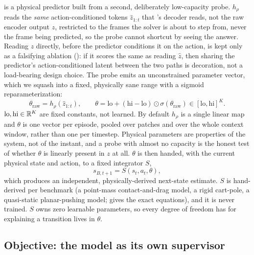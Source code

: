 \pathB is a physical predictor built from a second, deliberately
low-capacity probe. $h_\rho$ reads the \emph{same} action-conditioned
tokens $\hat z_{1:t}$ that \pathA's decoder reads, not the raw encoder
output $z$, restricted to the frames the solver is about to step from,
never the frame being predicted, so the probe cannot shortcut by seeing
the answer. Reading $z$ directly, before the predictor conditions it on
the action, is kept only as a falsifying ablation
(): if it scores the same as reading
$\hat z$, then sharing the predictor's action-conditioned latent between
the two paths is decoration, not a load-bearing design choice. The probe
emits an unconstrained parameter vector, which we squash into a fixed,
physically sane range with a sigmoid reparameterization:
\begin{equation}
  \theta_{\mathrm{raw}} = h_\rho(\hat z_{1:t}), \qquad
  \theta = \mathrm{lo} + (\mathrm{hi} - \mathrm{lo}) \odot
    \sigma(\theta_{\mathrm{raw}}) \in [\mathrm{lo}, \mathrm{hi}]^K.
\end{equation}
$\mathrm{lo}, \mathrm{hi} \in \mathbb{R}^K$ are fixed constants, not learned.
By default $h_\rho$ is a single linear map and $\theta$ is one vector
per episode, pooled over patches and over the whole context window,
rather than one per timestep. Physical parameters are properties of
the system, not of the instant, and a probe with almost no capacity is
the honest test of whether $\theta$ is linearly present in $z$ at all.
$\theta$ is then handed, with the current physical state and action,
to a fixed integrator $S$,
\begin{equation}
  s_{B,t+1} = S(s_t, a_t, \theta),
\end{equation}
which produces an independent, physically-derived next-state estimate.
$S$ is hand-derived per benchmark (a point-mass contact-and-drag
model, a rigid cart-pole, a quasi-static planar-pushing model;
 gives the exact equations), and it is
never trained. $S$ owns zero learnable parameters, so every degree of
freedom \pathB has for explaining a transition lives in $\theta$.

\subsection{Objective: the model as its own supervisor}
\label{sec:method-loss}

